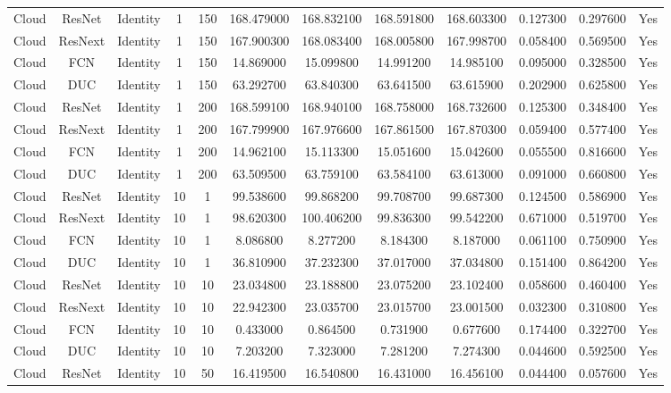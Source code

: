 \begin{tabular}{|c||c||c||c||c||c||c||c||c||c||c||c|}
Cloud & ResNet & Identity & 1 & 150 & 168.479000 & 168.832100 & 168.591800 & 168.603300 & 0.127300 & 0.297600 & Yes \\
Cloud & ResNext & Identity & 1 & 150 & 167.900300 & 168.083400 & 168.005800 & 167.998700 & 0.058400 & 0.569500 & Yes \\
Cloud & FCN & Identity & 1 & 150 & 14.869000 & 15.099800 & 14.991200 & 14.985100 & 0.095000 & 0.328500 & Yes \\
Cloud & DUC & Identity & 1 & 150 & 63.292700 & 63.840300 & 63.641500 & 63.615900 & 0.202900 & 0.625800 & Yes \\
Cloud & ResNet & Identity & 1 & 200 & 168.599100 & 168.940100 & 168.758000 & 168.732600 & 0.125300 & 0.348400 & Yes \\
Cloud & ResNext & Identity & 1 & 200 & 167.799900 & 167.976600 & 167.861500 & 167.870300 & 0.059400 & 0.577400 & Yes \\
Cloud & FCN & Identity & 1 & 200 & 14.962100 & 15.113300 & 15.051600 & 15.042600 & 0.055500 & 0.816600 & Yes \\
Cloud & DUC & Identity & 1 & 200 & 63.509500 & 63.759100 & 63.584100 & 63.613000 & 0.091000 & 0.660800 & Yes \\
Cloud & ResNet & Identity & 10 & 1 & 99.538600 & 99.868200 & 99.708700 & 99.687300 & 0.124500 & 0.586900 & Yes \\
Cloud & ResNext & Identity & 10 & 1 & 98.620300 & 100.406200 & 99.836300 & 99.542200 & 0.671000 & 0.519700 & Yes \\
Cloud & FCN & Identity & 10 & 1 & 8.086800 & 8.277200 & 8.184300 & 8.187000 & 0.061100 & 0.750900 & Yes \\
Cloud & DUC & Identity & 10 & 1 & 36.810900 & 37.232300 & 37.017000 & 37.034800 & 0.151400 & 0.864200 & Yes \\
Cloud & ResNet & Identity & 10 & 10 & 23.034800 & 23.188800 & 23.075200 & 23.102400 & 0.058600 & 0.460400 & Yes \\
Cloud & ResNext & Identity & 10 & 10 & 22.942300 & 23.035700 & 23.015700 & 23.001500 & 0.032300 & 0.310800 & Yes \\
Cloud & FCN & Identity & 10 & 10 & 0.433000 & 0.864500 & 0.731900 & 0.677600 & 0.174400 & 0.322700 & Yes \\
Cloud & DUC & Identity & 10 & 10 & 7.203200 & 7.323000 & 7.281200 & 7.274300 & 0.044600 & 0.592500 & Yes \\
Cloud & ResNet & Identity & 10 & 50 & 16.419500 & 16.540800 & 16.431000 & 16.456100 & 0.044400 & 0.057600 & Yes \\

\end{tabular}

